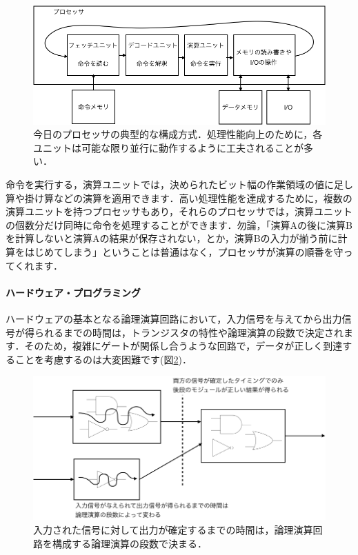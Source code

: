 \documentclass[a4paper,dvipdfmx]{jsarticle}
\begin{document}
 \begin{figure}[H]
  \begin{center}
   \includegraphics[width=.8\textwidth]{chapter01_figures/processor_model_image.png}
  \end{center}
  \caption{今日のプロセッサの典型的な構成方式．処理性能向上のために，各ユニットは可能な限り並行に動作するように工夫されることが多い．\label{fig:processor_model_image}}
 \end{figure}

命令を実行する，演算ユニットでは，決められたビット幅の作業領域の値に足し算や掛け算などの演算を適用できます．高い処理性能を達成するために，複数の演算ユニットを持つプロセッサもあり，それらのプロセッサでは，演算ユニットの個数分だけ同時に命令を処理することができます．勿論，「演算Aの後に演算Bを計算しないと演算Aの結果が保存されない，とか，演算Bの入力が揃う前に計算をはじめてしまう」ということは普通はなく，プロセッサが演算の順番を守ってくれます．

\paragraph{ハードウェア・プログラミング}

ハードウェアの基本となる論理演算回路において，入力信号を与えてから出力信号が得られるまでの時間は，トランジスタの特性や論理演算の段数で決定されます．そのため，複雑にゲートが関係し合うような回路で，データが正しく到達することを考慮するのは大変困難です(図\ref{fig:async_logic_timing})．

 \begin{figure}[H]
  \begin{center}
   \includegraphics[width=.8\textwidth]{chapter01_figures/async_logic_timing.png}
  \end{center}
  \caption{入力された信号に対して出力が確定するまでの時間は，論理演算回路を構成する論理演算の段数で決まる．\label{fig:async_logic_timing}}
 \end{figure}
\end{document}
